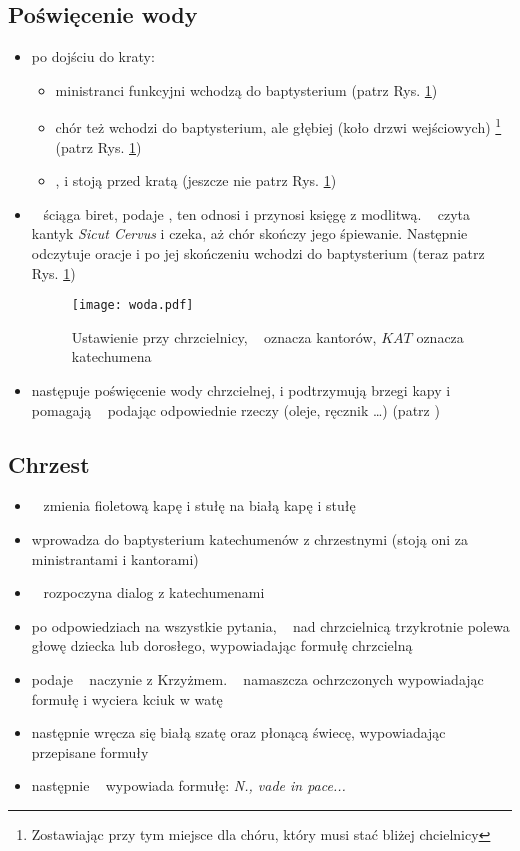 \subsection{Poświęcenie wody}
\begin{itemize}
	\item po dojściu do kraty:
	      \begin{itemize}
		      \item ministranci funkcyjni wchodzą do baptysterium (patrz Rys.
		            \ref{fig:woda})
		      \item chór też wchodzi do baptysterium, ale głębiej (koło drzwi
		            wejściowych) \footnote{Zostawiając przy tym miejsce dla
			            chóru, który musi stać bliżej chcielnicy} (patrz Rys.
		            \ref{fig:woda})
		      \item \ii,  i  stoją przed kratą (jeszcze nie patrz Rys.
		            \ref{fig:woda})
	      \end{itemize}
	\item \ii~ ściąga biret, podaje , ten odnosi i przynosi księgę z
	      modlitwą. \ii~ czyta kantyk \textit{Sicut Cervus} i czeka, aż chór
	      skończy jego śpiewanie. Następnie odczytuje oracje  i po jej skończeniu wchodzi do baptysterium (teraz patrz Rys.
	      \ref{fig:woda})
	      \begin{figure}[h!]
		      \centering
		      \texttt{[image: woda.pdf]}
		      \caption{Ustawienie przy chrzcielnicy, \spiew~ oznacza kantorów,
			      $KAT$ oznacza katechumena}
		      \label{fig:woda}
	      \end{figure}
	\item następuje poświęcenie wody chrzcielnej,  i  podtrzymują brzegi
	      kapy i pomagają \ii~ podając odpowiednie rzeczy (oleje, ręcznik \dots)
	      (patrz \textit{})
\end{itemize}
\subsection{Chrzest}
\begin{itemize}
	\item \ii~ zmienia {\color{violet} fioletową kapę i stułę} na
	      \textcolor{black!50}{białą kapę i stułę}
	\item {} wprowadza do baptysterium katechumenów z chrzestnymi (stoją oni
	      za ministrantami i kantorami)
	\item \ii~ rozpoczyna dialog z katechumenami
	\item po odpowiedziach na wszystkie pytania, \ii~ nad chrzcielnicą
	      trzykrotnie polewa głowę dziecka lub dorosłego, wypowiadając formułę
	      chrzcielną
	\item {} podaje \ii~ naczynie z Krzyżmem. \ii~ namaszcza ochrzczonych
	      wypowiadając formułę i wyciera kciuk w watę
	\item następnie wręcza się białą szatę oraz płonącą świecę, wypowiadając
	      przepisane formuły
	\item następnie \ii~ wypowiada formułę: \textit{N., vade in pace...}
\end{itemize}
